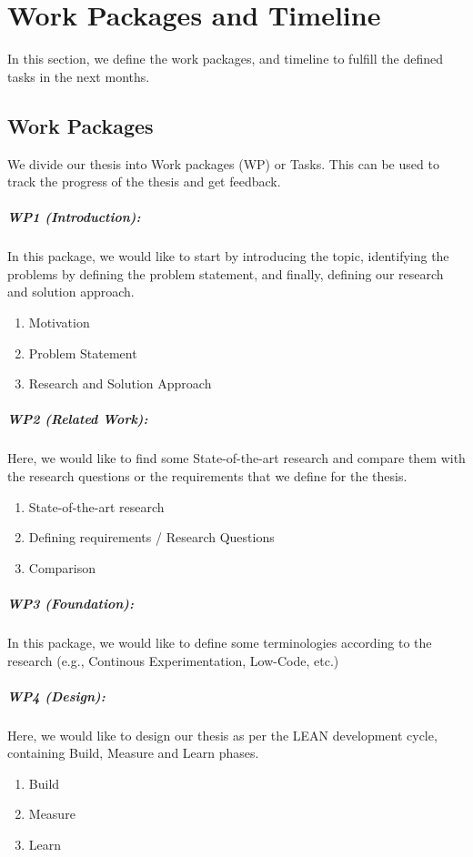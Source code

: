 \chapter{Work Packages and Timeline}
\label{chap:wps}
In this section, we define the work packages, and timeline to fulfill the defined tasks in the next months.

\section{Work Packages}
We divide our thesis into Work packages (WP) or Tasks.
This can be used to track the progress of the thesis and get feedback.

\paragraph{WP1 (Introduction):} In this package, we would like to start by introducing the topic, identifying the problems by defining the problem statement, and finally, defining our research and solution approach.
\begin{enumerate}
    \item Motivation
    \item Problem Statement
    \item Research and Solution Approach
\end{enumerate}

\paragraph{WP2 (Related Work):} Here, we would like to find some State-of-the-art research and compare them with the research questions or the requirements that we define for the thesis.
\begin{enumerate}
    \item State-of-the-art research
    \item Defining requirements / Research Questions
    \item Comparison
\end{enumerate}

\paragraph{WP3 (Foundation):} In this package, we would like to define some terminologies according to the research (e.g., Continous Experimentation, Low-Code, etc.)

\paragraph{WP4 (Design):} Here, we would like to design our thesis as per the LEAN development cycle, containing Build, Measure and Learn phases.
\begin{enumerate}
    \item Build
    \item Measure
    \item Learn
\end{enumerate}

